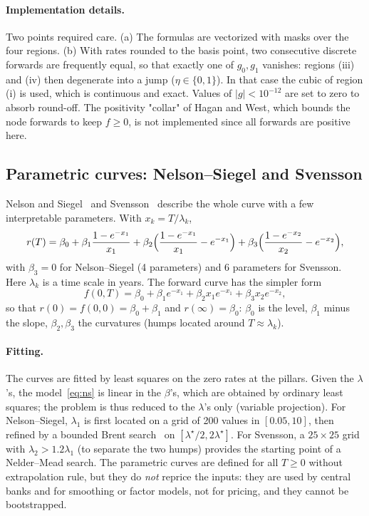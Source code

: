 \documentclass[11pt,a4paper]{article}
\theoremstyle{plain}
\theoremstyle{definition}
\begin{document}
\paragraph{Implementation details.} Two points required care. (a) The formulas are vectorized with masks over the four regions. (b) With rates rounded to the basis point, two consecutive discrete forwards are frequently equal, so that exactly one of $g_0,g_1$ vanishes: regions (iii) and (iv) then degenerate into a jump ($\eta\in\{0,1\}$). In that case the cubic of region (i) is used, which is continuous and exact. Values of $|g|<10^{-12}$ are set to zero to absorb round-off. The positivity "collar" of Hagan and West, which bounds the node forwards to keep $f\ge0$, is not implemented since all forwards are positive here.

\subsection{Parametric curves: Nelson--Siegel and Svensson}
Nelson and Siegel~\cite{nelsonsiegel} and Svensson~\cite{svensson} describe the whole curve with a few interpretable parameters. With $x_k=T/\lambda_k$,
\begin{equation}
    r(T)=\beta_0+\beta_1\frac{1-e^{-x_1}}{x_1}+\beta_2\Bigl(\frac{1-e^{-x_1}}{x_1}-e^{-x_1}\Bigr)+\beta_3\Bigl(\frac{1-e^{-x_2}}{x_2}-e^{-x_2}\Bigr),
    \label{eq:ns}
\end{equation}
with $\beta_3=0$ for Nelson--Siegel (4 parameters) and 6 parameters for Svensson. Here $\lambda_k$ is a time scale in years. The forward curve has the simpler form
\begin{equation}
    f(0,T)=\beta_0+\beta_1e^{-x_1}+\beta_2x_1e^{-x_1}+\beta_3x_2e^{-x_2},
\end{equation}
so that $r(0)=f(0,0)=\beta_0+\beta_1$ and $r(\infty)=\beta_0$: $\beta_0$ is the level, $\beta_1$ minus the slope, $\beta_2,\beta_3$ the curvatures (humps located around $T\approx\lambda_k$).

\paragraph{Fitting.} The curves are fitted by least squares on the zero rates at the pillars. Given the $\lambda$'s, the model~\eqref{eq:ns} is linear in the $\beta$'s, which are obtained by ordinary least squares; the problem is thus reduced to the $\lambda$'s only (variable projection). For Nelson--Siegel, $\lambda_1$ is first located on a grid of 200 values in $[0.05,10]$, then refined by a bounded Brent search~\cite{brent} on $[\lambda^\star/2,2\lambda^\star]$. For Svensson, a $25\times25$ grid with $\lambda_2>1.2\lambda_1$ (to separate the two humps) provides the starting point of a Nelder--Mead search. The parametric curves are defined for all $T\ge0$ without extrapolation rule, but they do \emph{not} reprice the inputs: they are used by central banks and for smoothing or factor models, not for pricing, and they cannot be bootstrapped.
\end{document}
